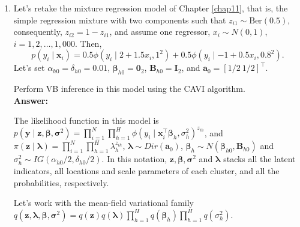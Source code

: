 \begin{enumerate}[leftmargin=*]
\item Let's retake the mixture regression model of Chapter \ref{chap11}, that is, the simple regression mixture with two components such that $z_{i1}\sim \text{Ber}(0.5)$, consequently, $z_{i2}=1-z_{i1}$, and assume one regressor, $x_i\sim N(0,1)$, $i=1,2,\dots,1,000$. Then, 
$$p(y_i \mid \boldsymbol{x}_i) = 
0.5 \phi(y_i \mid 2+1.5x_i,1^2)+0.5 \phi(y_i \mid -1+0.5x_i,0.8^2).$$
Let's set $\alpha_{h0}=\delta_{h0}=0.01$, $\boldsymbol{\beta}_{h0}=\boldsymbol{0}_2$, $\boldsymbol{B}_{h0}=\boldsymbol{I}_2$, and $\boldsymbol{a}_0=[1/2 \ 1/2]^{\top}$.

Perform VB inference in this model using the CAVI algorithm.\\

\textbf{Answer:}

The likelihood function in this model is $p(\bm{y}\mid \bm{z},\bm{\beta},\bm{\sigma}^2)=\prod_{i=1}^N\prod_{h=1}^H\phi(y_i\mid\bm{x}_i^{\top}\bm{\beta}_h,\sigma_h^2)^{z_{ih}}$, and $\pi(\bm{z}\mid\bm{\lambda})=\prod_{i=1}^N\prod_{h=1}^H\lambda_h^{z_{ih}}$, $\bm{\lambda}\sim Dir(\bm{a}_0)$, $\bm{\beta}_h\sim N(\bm{\beta}_{h0},\bm{B}_{h0})$ and $\sigma_h^2\sim IG(\alpha_{h0}/2,\delta_{h0}/2)$. In this notation, $\bm{z},\bm{\beta},\bm{\sigma}^2$ and $\bm{\lambda}$ stacks all the latent indicators, all locations and scale parameters of each cluster, and all the probabilities, respectively. 

Let's work with the mean-field variational family $q(\bm{z},\bm{\lambda},\bm{\beta},\bm{\sigma}^2)=q(\bm{z})q(\bm{\lambda})\prod_{h=1}^H q(\bm{\beta}_h)\prod_{h=1}^H q({\sigma}^2_h)$.


\end{enumerate}
